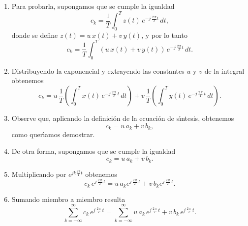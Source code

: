 \begin{enumerate}

\item Para probarla, supongamos que se cumple la igualdad
\begin{equation}
  c_{k} = \frac{1}{T} \int_{0}^{T} z(t) \, e^{-j \, \frac{2 \, \pi}{T} t} \,
  dt,
\end{equation}
donde se define $z(t) = u \, x(t) + v \, y(t)$, y por lo tanto
\begin{equation}
  c_{k} = \frac{1}{T} \int_{0}^{T} \left( u \, x(t) + v \, y(t)
  \right) \, e^{-j \, \frac{2 \, \pi}{T} t} \, dt.
\end{equation}

\item Distribuyendo la exponencial y extrayendo las constantes 
$u$ y $v$ de la integral obtenemos
\begin{equation}
  c_{k} = 
    u \, \frac{1}{T} \left( \int_{0}^{T}  x(t) \, e^{-j \, \frac{2 \, \pi}{T} \,
        t} \, dt \right) +
    v \, \frac{1}{T} \left( \int_{0}^{T}  y(t) \, e^{-j \, \frac{2 \, \pi}{T} \,
        t} \, dt \right).
\end{equation}

\item Observe que, aplicando la definici\'{o}n de la ecuaci\'{o}n de
  s\'{\i}ntesis, obtenemos
\begin{equation}
  c_{k} = u \, a_{k} + v \, b_{k},
\end{equation}
como quer\' {\i}amos demostrar.

\item De otra forma, supongamos que se cumple la igualdad
\begin{equation}
  c_{k} = u \, a_{k} + v \, b_{k}.
\end{equation}

\item Multiplicando por $e^{j k \frac{2 \pi}{T} t}$ obtenemos
\begin{equation}
  c_{k} \, e^{j \, \frac{2 \, \pi}{T} \, t} = u \, a_{k} e^{j \, \frac{2 \, \pi}{T} \,
    t} + v \, b_{k} e^{j \, \frac{2 \, \pi}{T} \, t}.
\end{equation}

\item Sumando miembro a miembro resulta
\begin{equation}
  \sum_{k=-\infty}^{\infty}  c_{k} \, e^{j \, \frac{2 \, \pi}{T} \, t} = 
    \sum_{k=-\infty}^{\infty} 
      u \, a_{k} \, e^{j \, \frac{2 \, \pi}{T} \, t} + 
      v \, b_{k} \, e^{j \, \frac{2 \, \pi}{T} \, t}.
\end{equation}


\end{enumerate}

